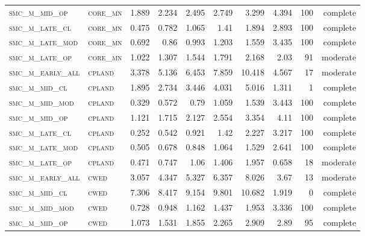 \begin{landscape}
\begin{center}
\begin{footnotesize}
\begin{longtable}{llrrrrr|rrr}
\textsc{smc\_m\_mid\_op   } & \textsc{core\_mn  }   & 1.889    & 2.234    & 2.495    & 2.749    & 3.299    & 4.394    & 100 & complete \\
\textsc{smc\_m\_late\_cl  } & \textsc{core\_mn  }   & 0.475    & 0.782    & 1.065    & 1.41     & 1.894    & 2.893    & 100 & complete \\
\textsc{smc\_m\_late\_mod } & \textsc{core\_mn  }   & 0.692    & 0.86     & 0.993    & 1.203    & 1.559    & 3.435    & 100 & complete \\
\textsc{smc\_m\_late\_op  } & \textsc{core\_mn  }   & 1.022    & 1.307    & 1.544    & 1.791    & 2.168    & 2.03     & 91  & moderate \\
\textsc{smc\_m\_early\_all} & \textsc{cpland    }   & 3.378    & 5.136    & 6.453    & 7.859    & 10.418   & 4.567    & 17  & moderate \\
\textsc{smc\_m\_mid\_cl   } & \textsc{cpland    }   & 1.895    & 2.734    & 3.446    & 4.031    & 5.016    & 1.311    & 1   & complete \\
\textsc{smc\_m\_mid\_mod  } & \textsc{cpland    }   & 0.329    & 0.572    & 0.79     & 1.059    & 1.539    & 3.443    & 100 & complete \\
\textsc{smc\_m\_mid\_op   } & \textsc{cpland    }   & 1.121    & 1.715    & 2.127    & 2.554    & 3.354    & 4.11     & 100 & complete \\
\textsc{smc\_m\_late\_cl  } & \textsc{cpland    }   & 0.252    & 0.542    & 0.921    & 1.42     & 2.227    & 3.217    & 100 & complete \\
\textsc{smc\_m\_late\_mod } & \textsc{cpland    }   & 0.505    & 0.678    & 0.848    & 1.064    & 1.529    & 2.641    & 100 & complete \\
\textsc{smc\_m\_late\_op  } & \textsc{cpland    }   & 0.471    & 0.747    & 1.06     & 1.406    & 1.957    & 0.658    & 18  & moderate \\
\textsc{smc\_m\_early\_all} & \textsc{cwed      }   & 3.057    & 4.347    & 5.327    & 6.357    & 8.026    & 3.67     & 13  & moderate \\
\textsc{smc\_m\_mid\_cl   } & \textsc{cwed      }   & 7.306    & 8.417    & 9.154    & 9.801    & 10.682   & 1.919    & 0   & complete \\
\textsc{smc\_m\_mid\_mod  } & \textsc{cwed      }   & 0.728    & 0.948    & 1.162    & 1.437    & 1.953    & 3.336    & 100 & complete \\
\textsc{smc\_m\_mid\_op   } & \textsc{cwed      }   & 1.073    & 1.531    & 1.855    & 2.265    & 2.909    & 2.89     & 95  & complete \\

\end{longtable}
\end{footnotesize}
\end{center}
\end{landscape}
